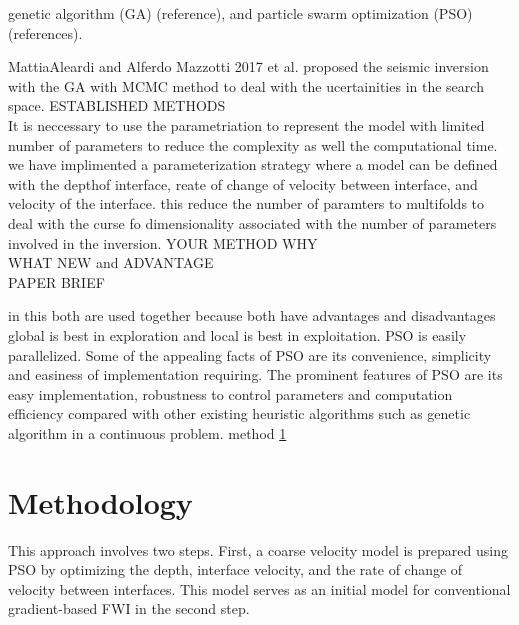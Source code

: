 \documentclass[paper,revised]{geophysics}
\begin{document}
 genetic algorithm (GA) (reference), and particle swarm optimization (PSO) (references).


MattiaAleardi and Alferdo Mazzotti 2017 et al. proposed the seismic inversion with the GA with MCMC method to deal with the ucertainities in the search space.
ESTABLISHED METHODS
\\
It is neccessary to use the parametriation to represent the model with limited number of parameters to reduce the complexity as well the computational time. we have implimented a parameterization strategy where a model can be defined with the depthof interface, reate of change of velocity between interface, and velocity of the interface. this reduce the number of paramters to multifolds to deal with the curse fo dimensionality associated with the number of parameters involved in the inversion.
YOUR METHOD WHY
\\ 
WHAT NEW and ADVANTAGE
\\
PAPER BRIEF



 in this both are used together because both have advantages and disadvantages global is best in exploration and local is best in exploitation. PSO is easily parallelized.
Some of the appealing facts of PSO are its convenience, simplicity and easiness of implementation requiring.
The prominent features of PSO are its easy implementation, robustness to control parameters and computation efficiency compared with other existing heuristic algorithms such as genetic algorithm in a continuous problem.
method \ref{method}
\section{Methodology}
\label{method}
This approach involves two steps. First, a coarse velocity model is prepared using PSO by optimizing the depth, interface velocity, and the rate of change of velocity between interfaces. This model serves as an initial model for conventional gradient-based FWI in the second step.
\end{document}
